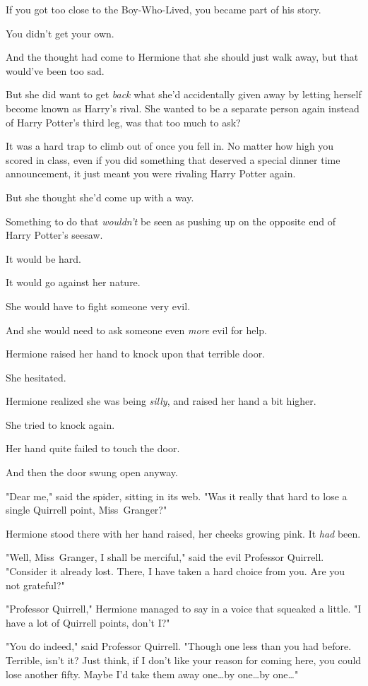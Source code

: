 If you got too close to the Boy-Who-Lived, you became part of his story.

You didn't get your own.

And the thought had come to Hermione that she should just walk away, but that
would've been too sad.

But she did want to get \emph{back} what she'd accidentally given away by
letting herself become known as Harry's rival. She wanted to be a separate
person again instead of Harry Potter's third leg, was that too much to ask?

It was a hard trap to climb out of once you fell in. No matter how high you
scored in class, even if you did something that deserved a special dinner time
announcement, it just meant you were rivaling Harry Potter again.

But she thought she'd come up with a way.

Something to do that \emph{wouldn't} be seen as pushing up on the opposite end
of Harry Potter's seesaw.

It would be hard.

It would go against her nature.

She would have to fight someone very evil.

And she would need to ask someone even \emph{more} evil for help.

Hermione raised her hand to knock upon that terrible door.

She hesitated.

Hermione realized she was being \emph{silly}, and raised her hand a bit higher.

She tried to knock again.

Her hand quite failed to touch the door.

And then the door swung open anyway.

"Dear me," said the spider, sitting in its web. "Was it really that hard to
lose a single Quirrell point, Miss~Granger?"

Hermione stood there with her hand raised, her cheeks growing pink. It
\emph{had} been.

"Well, Miss~Granger, I shall be merciful," said the evil Professor Quirrell.
"Consider it already lost. There, I have taken a hard choice from you. Are you
not grateful?"

"Professor Quirrell," Hermione managed to say in a voice that squeaked a
little. "I have a lot of Quirrell points, don't I?"

"You do indeed," said Professor Quirrell. "Though one less than you had before.
Terrible, isn't it? Just think, if I don't like your reason for coming here,
you could lose another fifty. Maybe I'd take them away one…by
one…by one…"

